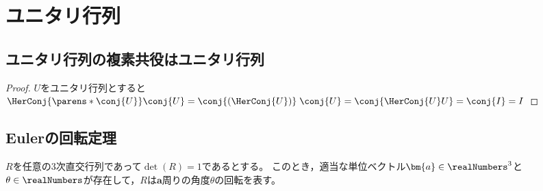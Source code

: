 \chapter{ユニタリ行列}
    \section{ユニタリ行列の複素共役はユニタリ行列}
        \begin{proof}
            $U$をユニタリ行列とすると$\HerConj{\parens*{\conj{U}}}\conj{U} = \conj{(\HerConj{U})}\;\conj{U} = \conj{\HerConj{U}U} = \conj{I} = I$
        \end{proof}
    \section{Eulerの回転定理}
        \begin{shadebox}
            $R$を任意の3次直交行列であって$\det(R)=1$であるとする。
            このとき，適当な単位ベクトル$\bm{a}\in\realNumbers^3$と$\theta\in\realNumbers$が存在して，$R$は$\bm{a}$周りの角度$\theta$の回転を表す。
        \end{shadebox}
